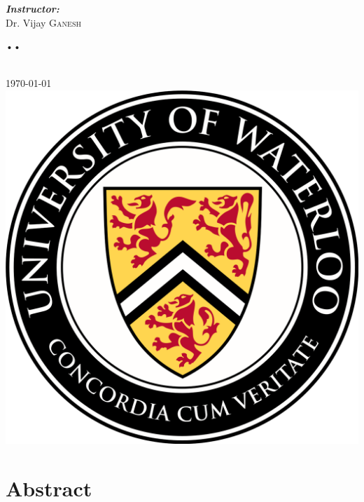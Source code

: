 \documentclass[11pt]{article}
\begin{document}
\begin{titlepage}
\begin{minipage}{0.4\textwidth}
\end{minipage}
\begin{minipage}{0.4\textwidth}
\begin{flushright} \large
\emph{\bfseries Instructor:} \\
Dr. Vijay \textsc{Ganesh} %
\end{flushright}
\textsc{•}\textsc{•}\end{minipage}\\[2cm]
{\large \today}\\[1cm] 
\includegraphics[scale=.14]{figures/waterloo.png}%
\vfill %

\end{titlepage}


\section{Abstract}
\end{document}
